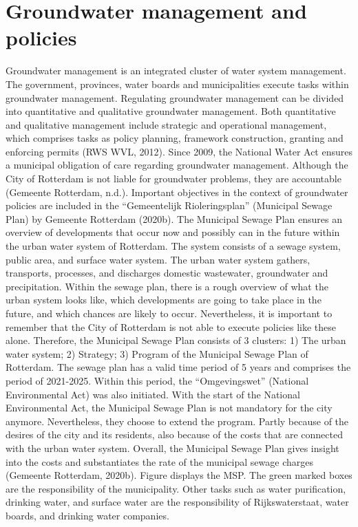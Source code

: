 \section{Groundwater management and policies} 
Groundwater management is an integrated cluster of water system management. The government, provinces, water boards and municipalities execute tasks within groundwater management. Regulating groundwater management can be divided into quantitative and qualitative groundwater management. Both quantitative and qualitative management include strategic and operational management, which comprises tasks as policy planning, framework construction, granting and enforcing  permits (RWS WVL, 2012). Since 2009, the National Water Act ensures a municipal obligation of care regarding groundwater management. Although the City of Rotterdam is not liable for groundwater problems, they are accountable (Gemeente Rotterdam, n.d.). Important objectives in the context of groundwater policies are included in the “Gemeentelijk Rioleringsplan” (Municipal Sewage Plan) by Gemeente Rotterdam (2020b). The Municipal Sewage Plan ensures an overview of developments that occur now and possibly can in the future within the urban water system of Rotterdam. The system consists of a sewage system, public area, and surface water system. The urban water system gathers, transports, processes, and discharges domestic wastewater, groundwater and precipitation. Within the sewage plan, there is a rough overview of what the urban system looks like, which developments are going to take place in the future, and which chances are likely to occur. Nevertheless, it is important to remember that the City of Rotterdam is not able to execute policies like these alone. Therefore, the Municipal Sewage Plan consists of 3 clusters: 1) The urban water system; 2) Strategy; 3) Program of the Municipal Sewage Plan of Rotterdam. The sewage plan has a valid time period of 5 years and comprises the period of 2021-2025. Within this period, the “Omgevingswet” (National Environmental Act) was also initiated. With the start of the National Environmental Act, the Municipal Sewage Plan is not mandatory for the city anymore. Nevertheless, they choose to extend the program. Partly because of the desires of the city and its residents, also because of the costs that are connected with the urban water system. Overall, the Municipal Sewage Plan gives insight into the costs and substantiates the rate of the municipal sewage charges (Gemeente Rotterdam, 2020b). Figure  displays the MSP.  The green marked boxes are the responsibility of the municipality. Other tasks such as water purification, drinking water, and surface water are the responsibility of Rijkswaterstaat, water boards, and drinking water companies. 

